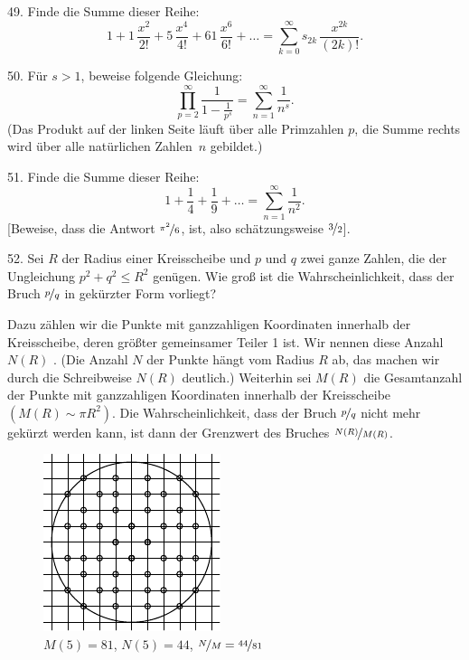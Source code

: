 \begin{problem}{49.}
	Finde die Summe dieser Reihe:
	\begin{equation*}
		1+1\, \frac{x^2}{2!}+5\, \frac{x^4}{4!}+61\, \frac{x^6}{6!}+\dots=
		\textstyle\sum\limits_{k=0}^{\infty} s_{2k}\,\frac{x^{2k}}{(2k)!}.
	\end{equation*}
\end{problem}

\begin{problem}{50.}
	Für $s>1$, beweise folgende Gleichung:
	\begin{equation*}
		\textstyle\prod\limits_{p=2}^{\infty} \frac{1}{1-\frac{1}{p^s}}=\textstyle\sum\limits_{n=1}^{\infty} \frac{1}{n^s}.
	\end{equation*}
	(Das Produkt auf der linken Seite läuft über alle Primzahlen $p$, die Summe rechts wird über alle natürlichen Zahlen~$n$ gebildet.)
\end{problem}

\begin{problem}{51.}
	Finde die Summe dieser Reihe:
	\begin{equation*}
		1+ \frac{1}{4}+ \frac{1}{9}+\dots=\textstyle\sum\limits_{n=1}^{\infty} \frac{1}{n^2}.
	\end{equation*}
	[Beweise, dass die Antwort $\nicefrac{\pi^2}{6}$, ist, also schätzungsweise $\nicefrac{3}{2}$].
\end{problem}

\begin{problem}{52.}
	Sei $R$ der Radius einer Kreisscheibe und $p$ und $q$ zwei ganze Zahlen, die der Ungleichung $p^2+q^2 \leqslant R^2$ genügen. Wie groß ist die Wahrscheinlichkeit, dass der Bruch $\nicefrac{p}{q}$ in gekürzter Form vorliegt?
	
	Dazu zählen wir die Punkte mit ganzzahligen Koordinaten innerhalb der Kreis\-schei\-be, deren größter gemeinsamer Teiler 1 ist. Wir nennen diese Anzahl $N(R)$ . (Die Anzahl $N$ der Punkte hängt vom Radius $R$ ab, das machen wir durch die Schreibweise $N(R)$ deutlich.)  Weiterhin sei $M(R)$ die Gesamtanzahl der Punkte mit ganzzahligen Koordinaten innerhalb der Kreisscheibe $(M(R) \sim \pi R^2)$. Die Wahrscheinlichkeit, dass der Bruch $\nicefrac{p}{q}$ nicht mehr gekürzt werden kann, ist dann der Grenzwert des Bruches $\nicefrac{N(R)}{M(R)}$.
	\begin{figure}
		\includegraphics{taskbook-36}\\
		\footnotesize $M(5)=81$, $N(5)=44$, $\nicefrac{N}{M} = \nicefrac{44}{81}$
	\end{figure}
\end{problem}

